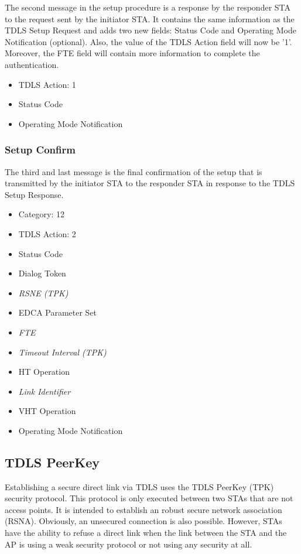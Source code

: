 The second message in the setup procedure is a response by the responder STA to the request sent by the initiator STA. It contains the same information as the TDLS Setup Request and adds two new fields: Status Code and Operating Mode Notification (optional). Also, the value of the TDLS Action field will now be '1'. Moreover, the FTE field will contain more information to complete the authentication.

\begin{itemize}
	\item TDLS Action: 1
	\item Status Code
	\item Operating Mode Notification
\end{itemize} 


\subsubsection{Setup Confirm}

The third and last message is the final confirmation of the setup that is transmitted by the initiator STA to the responder STA in response to the TDLS Setup Response.

\begin{itemize}
	\item Category: 12
	\item TDLS Action: 2
	\item Status Code
	\item Dialog Token
	\item \emph{RSNE (TPK)}
	\item EDCA Parameter Set
	\item \emph{FTE}
	\item \emph{Timeout Interval (TPK)}
	\item HT Operation
	\item \emph{Link Identifier}
	\item VHT Operation
	\item Operating Mode Notification
\end{itemize}

\subsection{TDLS PeerKey}

Establishing a secure direct link via TDLS uses the TDLS PeerKey (TPK) security protocol. This protocol is only executed between two STAs that are not access points. It is intended to establish an robust secure network association (RSNA). Obviously, an unsecured connection is also possible. However, STAs have the ability to refuse a direct link when the link between the STA and the AP is using a weak security protocol or not using any security at all. 

